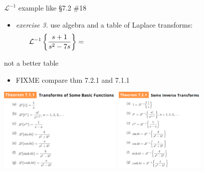 \documentclass[urlcolor=blue,dvipsnames]{beamer}
\begin{document}
\begin{frame}{$\mathcal{L}^{-1}$ example like \S7.2 \#18}

\begin{itemize}
\item \emph{exercise 3.}  use algebra and a table of Laplace transforms:
    $$\LLi{\frac{s+1}{s^2-7s}} = \hspace{80mm}$$
\end{itemize}

\vspace{50mm}
\end{frame}


\begin{frame}{not a better table}

\begin{itemize}
\item FIXME compare thm 7.2.1 and 7.1.1
\end{itemize}

\mbox{\includegraphics[height=40mm]{figs/laplacetable.pdf} \qquad \includegraphics[height=40mm]{figs/inverselaplacetable.pdf}}

\end{frame}
\end{document}
